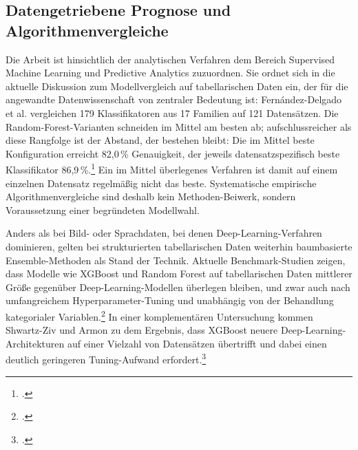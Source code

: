 \documentclass[12pt,a4paper]{article}
\begin{document}
\subsection{Datengetriebene Prognose und Algorithmenvergleiche}


Die Arbeit ist hinsichtlich der analytischen Verfahren dem Bereich Supervised Machine Learning und
Predictive Analytics zuzuordnen. Sie ordnet sich in die aktuelle Diskussion zum Modellvergleich auf
tabellarischen Daten ein, der für die angewandte Datenwissenschaft von zentraler Bedeutung ist:
Fernández-Delgado et al. vergleichen 179 Klassifikatoren aus 17 Familien auf 121 Datensätzen. Die
Random-Forest-Varianten schneiden im Mittel am besten ab; aufschlussreicher als diese Rangfolge ist
der Abstand, der bestehen bleibt: Die im Mittel beste Konfiguration erreicht 82,0\,\% Genauigkeit,
der jeweils datensatzspezifisch beste Klassifikator 86,9\,\%.\footcite[3133, 3175]{FernandezDelgado2014}
Ein im Mittel überlegenes Verfahren ist damit auf einem einzelnen Datensatz regelmäßig nicht das
beste. Systematische empirische Algorithmenvergleiche sind deshalb kein Methoden-Beiwerk, sondern
Voraussetzung einer begründeten Modellwahl.

Anders als bei Bild- oder Sprachdaten, bei denen Deep-Learning-Verfahren dominieren, gelten bei
strukturierten tabellarischen Daten weiterhin baumbasierte Ensemble-Methoden als Stand der Technik.
Aktuelle Benchmark-Studien zeigen, dass Modelle wie XGBoost und Random Forest auf tabellarischen
Daten mittlerer Größe gegenüber Deep-Learning-Modellen überlegen bleiben, und zwar auch nach
umfangreichem Hyperparameter-Tuning und unabhängig von der Behandlung kategorialer
Variablen.\footcite[1, 6]{Grinsztajn2022} In einer komplementären Untersuchung kommen Shwartz-Ziv und
Armon zu dem Ergebnis, dass XGBoost neuere Deep-Learning-Architekturen auf einer Vielzahl von
Datensätzen übertrifft und dabei einen deutlich geringeren Tuning-Aufwand
erfordert.\footcite[1]{ShwartzZiv2021}
\end{document}
